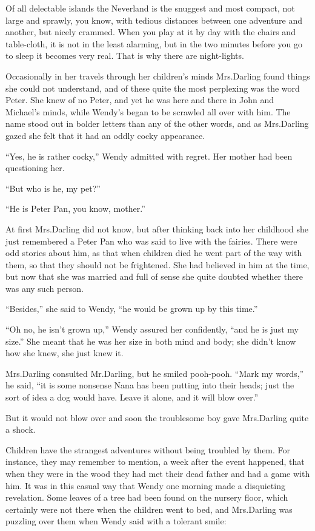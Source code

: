 Of all delectable islands the Neverland is the snuggest and most compact,
not large and sprawly, you know, with tedious distances between one adventure and another,
but nicely crammed.
When you play at it by day with the chairs and table-cloth, it is not in the least alarming,
but in the two minutes before you go to sleep it becomes very real.
That is why there are night-lights.

Occasionally in her travels through her children’s minds Mrs.\@ Darling found things she could not understand,
and of these quite the most perplexing was the word Peter.
She knew of no Peter, and yet he was here and there in John and Michael’s minds,
while Wendy’s began to be scrawled all over with him.
The name stood out in bolder letters than any of the other words,
and as Mrs.\@ Darling gazed she felt that it had an oddly cocky appearance.

“Yes, he is rather cocky,” Wendy admitted with regret.
Her mother had been questioning her.

“But who is he, my pet?”

“He is Peter Pan, you know, mother.”

At first Mrs.\@ Darling did not know,
but after thinking back into her childhood she just remembered a Peter Pan who was said to live with the fairies.
There were odd stories about him,
as that when children died he went part of the way with them, so that they should not be frightened.
She had believed in him at the time,
but now that she was married and full of sense she quite doubted whether there was any such person.

“Besides,” she said to Wendy, “he would be grown up by this time.”

“Oh no, he isn’t grown up,” Wendy assured her confidently, “and he is just my size.”
She meant that he was her size in both mind and body;
she didn’t know how she knew, she just knew it.

Mrs.\@ Darling consulted Mr.\@ Darling, but he smiled pooh-pooh.
“Mark my words,” he said, “it is some nonsense Nana has been putting into their heads;
just the sort of idea a dog would have.
Leave it alone, and it will blow over.”

But it would not blow over and soon the troublesome boy gave Mrs.\@ Darling quite a shock.

Children have the strangest adventures without being troubled by them.
For instance, they may remember to mention, a week after the event happened,
that when they were in the wood they had met their dead father and had a game with him.
It was in this casual way that Wendy one morning made a disquieting revelation.
Some leaves of a tree had been found on the nursery floor,
which certainly were not there when the children went to bed,
and Mrs.\@ Darling was puzzling over them when Wendy said with a tolerant smile:

